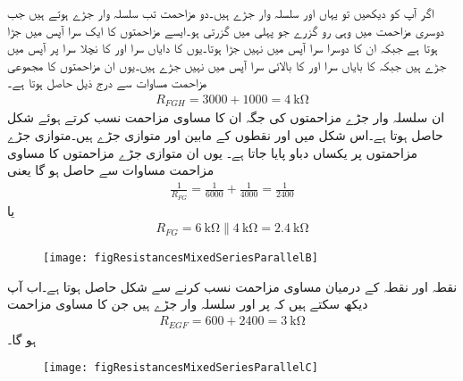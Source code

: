 اگر آپ  کو دیکھیں تو  یہاں  اور  سلسلہ وار جڑے ہیں۔دو مزاحمت تب سلسلہ وار جڑے ہوتے ہیں جب دوسری مزاحمت میں وہی رو گزرے جو پہلی میں گزرتی ہو۔ایسے مزاحمتوں کا ایک سرا آپس میں جڑا ہوتا ہے جبکہ ان کا دوسرا سرا آپس میں نہیں جڑا ہوتا۔یوں  کا دایاں سرا اور  کا نچلا سرا  پر آپس میں جڑے ہیں جبکہ  کا بایاں سرا اور  کا بالائی سرا آپس میں نہیں جڑے ہیں۔یوں ان مزاحمتوں کا مجموعی مزاحمت مساوات  سے درج ذیل حاصل ہوتا ہے۔
\begin{align*}
R_{FGH}=3000+1000=\SI{4}{\kilo\ohm}
\end{align*}
ان سلسلہ وار جڑے مزاحمتوں کی جگہ ان کا مساوی مزاحمت  نسب کرتے ہوئے شکل  حاصل ہوتا ہے۔اس شکل میں  اور  نقطوں کے مابین  اور  متوازی جڑے ہیں۔متوازی جڑے مزاحمتوں پر یکساں دباو پایا جاتا ہے۔ یوں ان متوازی جڑے مزاحمتوں کا مساوی مزاحمت مساوات  سے حاصل ہو گا یعنی 
\begin{align*}
\frac{1}{R_{FG}}=\frac{1}{6000}+\frac{1}{4000}=\frac{1}{2400}
\end{align*}
یا
\begin{align*}
R_{FG}=\SI{6}{\kilo\ohm} \parallel \SI{4}{\kilo\ohm}=\SI{2.4}{\kilo\ohm}
\end{align*}

\begin{figure}
\centering
\texttt{[image: figResistancesMixedSeriesParallelB]}
\caption{}
\label{مشق_مزاحمتی_سلسلہ_وار_متوازی_مزاحمت_الف}
\end{figure}

نقطہ  اور نقطہ  کے درمیان مساوی مزاحمت نسب کرنے سے شکل  حاصل ہوتا ہے۔اب آپ دیکھ سکتے ہیں کہ  پر  اور  سلسلہ وار جڑے ہیں جن کا مساوی مزاحمت
\begin{align*}
R_{EGF}=600+2400=\SI{3}{\kilo\ohm}
\end{align*}
ہو گا۔
\begin{figure}
\centering
\texttt{[image: figResistancesMixedSeriesParallelC]}
\caption{}
\label{مشق_مزاحمتی_سلسلہ_وار_متوازی_مزاحمت_ب}
\end{figure}

